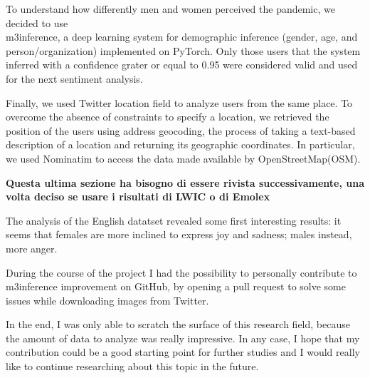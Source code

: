 To understand how differently men and women perceived the pandemic, we decided to use\\ m3inference, a deep learning system for demographic inference (gender, age, and person/organization) implemented on PyTorch. Only those users that the system inferred with a confidence grater or equal to 0.95 were considered valid and used for the next sentiment analysis.

Finally, we used Twitter location field to analyze users from the same place. To overcome the absence of constraints to specify a location, we retrieved the position of the users using address geocoding, the process of taking a text-based description of a location and returning its geographic coordinates. In particular, we used Nominatim to access the data made available by OpenStreetMap(OSM).


\textbf{Questa ultima sezione ha bisogno di essere rivista successivamente, una volta deciso se usare i risultati di LWIC o di Emolex}

The analysis of the English datatset revealed some first interesting results: it seems that females are more inclined to express joy and sadness; males instead, more anger.

During the course of the project I had the possibility to personally contribute to m3inference improvement on GitHub, by opening a pull request to solve some issues while downloading images from Twitter.

In the end, I was only able to scratch the surface of this research field, because the amount of data to analyze was really impressive. In any case, I hope that my contribution could be a good starting point for further studies and I would really like to continue researching about this topic in the future.